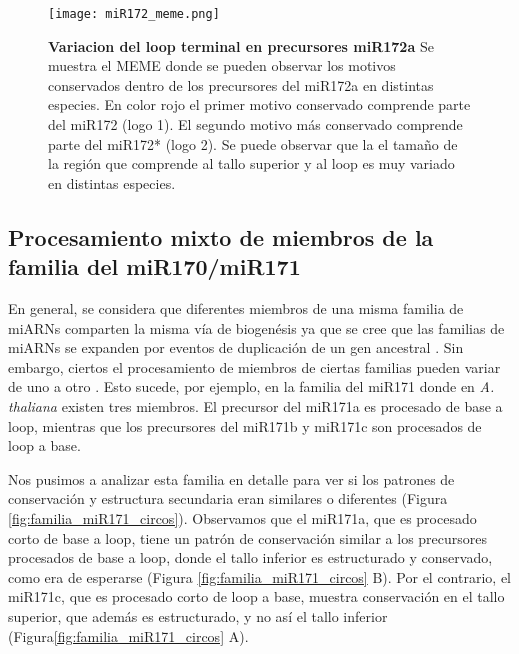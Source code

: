 \begin{landscape}
    \begin{figure}[htbp!] 
        \centering    
        \texttt{[image: miR172\_meme.png]}
        \caption[Variacion del loop terminal en precursores miR172a]{
			\textbf{Variacion del loop terminal en precursores miR172a}
        Se muestra el MEME donde se pueden observar los motivos conservados dentro de los precursores del miR172a en distintas especies.
        En color rojo el primer motivo conservado comprende parte del miR172 (logo 1).
        El segundo motivo más conservado comprende parte del miR172* (logo 2).
        Se puede observar que la el tamaño de la región que comprende al tallo superior y al loop es muy variado en distintas especies.
        }
        \label{fig:miR172_meme}
    \end{figure}
\end{landscape}


\subsection{Procesamiento mixto de miembros de la familia del miR170/miR171}

En general, se considera que diferentes miembros de una misma familia de miARNs comparten la misma vía de biogenésis ya que se cree que las familias de miARNs se expanden por eventos de duplicación de un gen ancestral \citep{pmid15565108}.
Sin embargo, ciertos el procesamiento de miembros de ciertas familias pueden variar de uno a otro \citep{Bologna2013}.
Esto sucede, por ejemplo, en la familia del miR171 donde en \textit{A. thaliana} existen tres miembros. 
El precursor del miR171a es procesado de base a loop, mientras que los precursores del miR171b y miR171c son procesados de loop a base.

Nos pusimos a analizar esta familia en detalle para ver si los patrones de conservación y estructura secundaria eran similares o diferentes (Figura \ref{fig:familia_miR171_circos}).
Observamos que el miR171a, que es procesado corto de base a loop, tiene un patrón de conservación similar a los precursores procesados de base a loop, donde el tallo inferior es estructurado y conservado, como era de esperarse (Figura \ref{fig:familia_miR171_circos} B).
Por el contrario, el miR171c, que es procesado corto de loop a base, muestra conservación en el tallo superior, que además es estructurado, y no así el tallo inferior (Figura\ref{fig:familia_miR171_circos} A).


